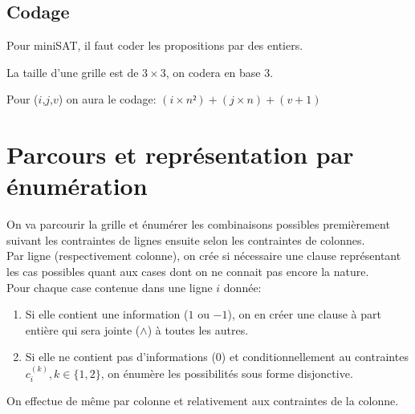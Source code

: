\documentclass[a4paper,12pt]{report}
\begin{document}
\subsection{Codage}
Pour miniSAT, il faut coder les propositions par des entiers.


La taille d'une grille est de $3\times3$, on codera en base 3.


Pour ($i$,$j$,$v$) on aura le codage: $(i \times n²)+(j \times n)+(v+1)$


\section{Parcours et représentation par énumération}


On va parcourir la grille et énumérer les combinaisons possibles premièrement suivant les contraintes de lignes ensuite selon les contraintes de colonnes.\\ 

Par ligne (respectivement colonne), on crée si nécessaire une clause représentant les cas possibles quant aux cases dont on ne connait pas encore la nature.\\

Pour chaque case contenue dans une ligne $i$ donnée:
\begin{enumerate}
\item Si elle contient une information ($1$ ou $-1$), on en créer une clause à part entière qui sera jointe ($\wedge$) à toutes les autres.
\item Si elle ne contient pas d'informations ($0$) et conditionnellement au contraintes $c_i^{(k)}, k\in\{1,2\}$, on énumère les possibilités sous forme disjonctive.
\end{enumerate}
On effectue de même par colonne et relativement aux contraintes de la colonne.\\


%
\end{document}
